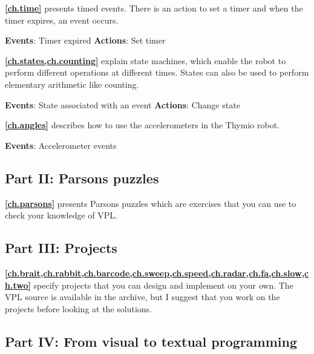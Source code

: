 \medskip

\textbf{\cref{ch.time}} presents timed events. There is an action
to set a timer and when the timer expires, an event occurs.

\textbf{Events}: Timer expired \hfill \textbf{Actions}: Set timer

 \hfill {}

\newpage

\textbf{\cref{ch.states,ch.counting}} explain state machines, which
enable the robot to perform different operations at different times.
States can also be used to perform elementary arithmetic like counting.

\textbf{Events}: State associated with an event \hfill \textbf{Actions}:
Change state

 \hfill {}

\medskip

\textbf{\cref{ch.angles}} describes how to use the accelerometers
in the Thymio robot.

\textbf{Events}: Accelerometer events

 \quad {}

\bigskip

\subsection*{Part II: Parsons puzzles}

\textbf{\cref{ch.parsons}} presents Parsons puzzles which are exercises
that you can use to check your knowledge of VPL.

\bigskip

\subsection*{Part III: Projects}

\textbf{\cref{ch.brait,ch.rabbit,ch.barcode,ch.sweep,ch.speed,ch.radar,ch.fa,ch.slow,ch.two}}
specify projects that you can design and implement on your own.
The VPL source is available in the archive, but I suggest that you work
on the projects before looking at the solutions.

\bigskip

\subsection*{Part IV: From visual to textual programming}

